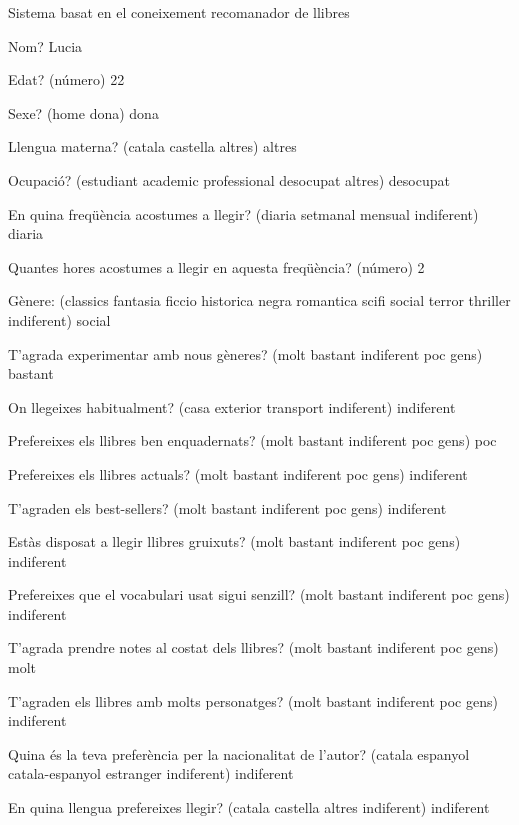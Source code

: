 Sistema basat en el coneixement recomanador de llibres

Nom? Lucia

Edat?  (número) 22

Sexe? (home dona) dona

Llengua materna? (catala castella altres) altres

Ocupació? (estudiant academic professional desocupat altres) desocupat

En quina freqüència acostumes a llegir? (diaria setmanal mensual indiferent) diaria

Quantes hores acostumes a llegir en aquesta freqüència? (número) 2

Gènere:  (classics fantasia ficcio historica negra romantica scifi social terror thriller indiferent) social

T'agrada experimentar amb nous gèneres? (molt bastant indiferent poc gens) bastant

On llegeixes habitualment? (casa exterior transport indiferent) indiferent

Prefereixes els llibres ben enquadernats? (molt bastant indiferent poc gens) poc

Prefereixes els llibres actuals? (molt bastant indiferent poc gens) indiferent

T'agraden els best-sellers? (molt bastant indiferent poc gens) indiferent

Estàs disposat a llegir llibres gruixuts? (molt bastant indiferent poc gens) indiferent

Prefereixes que el vocabulari usat sigui senzill? (molt bastant indiferent poc gens) indiferent

T'agrada prendre notes al costat dels llibres? (molt bastant indiferent poc gens) molt

T'agraden els llibres amb molts personatges? (molt bastant indiferent poc gens) indiferent

Quina és la teva preferència per la nacionalitat de l'autor? (catala espanyol catala-espanyol estranger indiferent) indiferent

En quina llengua prefereixes llegir? (catala castella altres indiferent) indiferent

